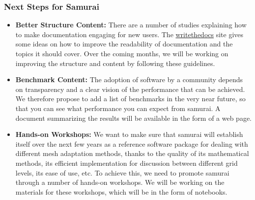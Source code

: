 \subsubsection{Next Steps for Samurai}
\label{sec:Samurai:next-steps}

\begin{itemize}
        \item \textbf{Better Structure Content:} There are a number of studies explaining how to make documentation engaging for new users. The \href{https://www.writethedocs.org}{writethedocs} site gives some ideas on how to improve the readability of documentation and the topics it should cover. Over the coming months, we will be working on improving the structure and content by following these guidelines.
        \item \textbf{Benchmark Content:} The adoption of software by a community depends on transparency and a clear vision of the performance that can be achieved. We therefore propose to add a list of benchmarks in the very near future, so that you can see what performance you can expect from samurai. A document summarizing the results will be available in the form of a web page.
        \item \textbf{Hands-on Workshops:} We want to make sure that samurai will establish itself over the next few years as a reference software package for dealing with different mesh adaptation methods, thanks to the quality of its mathematical methods, its efficient implementation for discussion between different grid levels, its ease of use, etc. To achieve this, we need to promote samurai through a number of hands-on workshops. We will be working on the materials for these workshops, which will be in the form of notebooks.
\end{itemize}